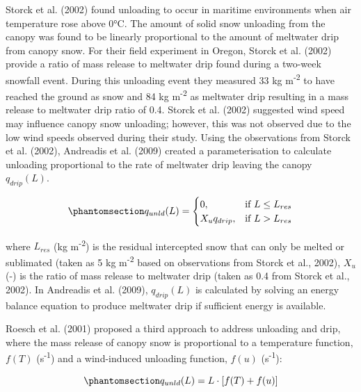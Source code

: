 \documentclass[
  letterpaper,
]{tex/uofsthesis-cs}
\begin{document}
Storck et al. (2002) found unloading to occur in maritime environments
when air temperature rose above 0°C. The amount of solid snow unloading
from the canopy was found to be linearly proportional to the amount of
meltwater drip from canopy snow. For their field experiment in Oregon,
Storck et al. (2002) provide a ratio of mass release to meltwater drip
found during a two-week snowfall event. During this unloading event they
measured 33 kg m\textsuperscript{-2} to have reached the ground as snow
and 84 kg m\textsuperscript{-2} as meltwater drip resulting in a mass
release to meltwater drip ratio of 0.4. Storck et al. (2002) suggested
wind speed may influence canopy snow unloading; however, this was not
observed due to the low wind speeds observed during their study. Using
the observations from Storck et al. (2002), Andreadis et al. (2009)
created a parameterisation to calculate unloading proportional to the
rate of meltwater drip leaving the canopy \(q_{drip}(L)\).

\begin{equation}\phantomsection\label{eq-sa-unload-dudt}{
q_{unld}(L) = \begin{cases}
    0,& \text{if } L \le L_{res} \\
    X_u q_{drip},              & \text{if }  L > L_{res}
\end{cases}
}\end{equation}

where \(L_{res}\) (kg m\textsuperscript{-2}) is the residual intercepted
snow that can only be melted or sublimated (taken as 5 kg
m\textsuperscript{-2} based on observations from Storck et al., 2002),
\(X_u\) (-) is the ratio of mass release to meltwater drip (taken as 0.4
from Storck et al., 2002). In Andreadis et al. (2009), \(q_{drip}(L)\)
is calculated by solving an energy balance equation to produce meltwater
drip if sufficient energy is available.

Roesch et al. (2001) proposed a third approach to address unloading and
drip, where the mass release of canopy snow is proportional to a
temperature function, \(f(T)\) (s\textsuperscript{-1}) and a
wind-induced unloading function, \(f(u)\) (s\textsuperscript{-1}):

\begin{equation}\phantomsection\label{eq-roesch-unload}{
q_{unld}(L) = L \cdot [f(T) + f(u)]
}\end{equation}
\end{document}
